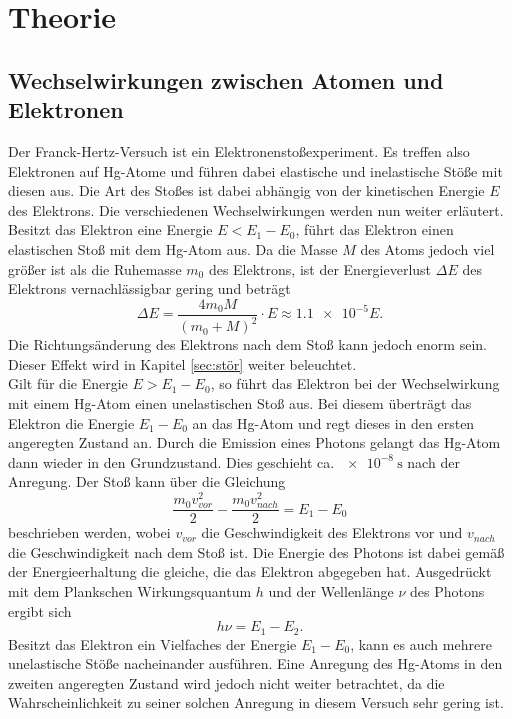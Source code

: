 \section{Theorie}
\label{sec:Theorie}

\subsection{Wechselwirkungen zwischen Atomen und Elektronen}
\label{sec:wechsel}
Der Franck-Hertz-Versuch ist ein Elektronenstoßexperiment. Es treffen also Elektronen auf Hg-Atome und führen dabei elastische und
inelastische Stöße mit diesen aus. Die Art des Stoßes ist dabei abhängig von der kinetischen Energie $E$ des Elektrons. Die verschiedenen
Wechselwirkungen werden nun weiter erläutert.
\\\noindent
Besitzt das Elektron eine Energie $E<E_1-E_0$, führt das Elektron einen elastischen Stoß mit dem Hg-Atom aus. Da die Masse $M$ des Atoms
jedoch viel größer ist als die Ruhemasse $m_0$ des Elektrons, ist der Energieverlust $\Delta E$ des Elektrons vernachlässigbar gering und beträgt
\begin{equation*}
    \Delta E=\frac{4m_0M}{(m_0+M)^2}\cdot E\approx \num{1.1e-5}E    .
\end{equation*}
Die Richtungsänderung des Elektrons nach dem Stoß kann jedoch enorm sein. Dieser Effekt wird in Kapitel \ref{sec:stör} weiter beleuchtet.
\\\noindent
Gilt für die Energie $E>E_1-E_0$, so führt das Elektron bei der Wechselwirkung mit einem Hg-Atom einen unelastischen Stoß aus. Bei diesem
überträgt das Elektron die Energie $E_1-E_0$ an das Hg-Atom und regt dieses in den ersten angeregten Zustand an. Durch die Emission eines
Photons gelangt das Hg-Atom dann wieder in den Grundzustand. Dies geschieht ca. $\SI{e-8}{\second}$ nach der Anregung. Der Stoß kann über
die Gleichung
\begin{equation}
    \frac{m_0v_{vor}^2}{2}-\frac{m_0v_{nach}^2}{2}=E_1-E_0
    \label{eqn:stoß}
\end{equation}
beschrieben werden, wobei $v_{vor}$ die Geschwindigkeit des Elektrons vor und $v_{nach}$ die Geschwindigkeit nach dem Stoß ist.
Die Energie des Photons ist dabei gemäß der Energieerhaltung die gleiche, die das Elektron abgegeben hat.
Ausgedrückt mit dem Plankschen Wirkungsquantum $h$ und der Wellenlänge $\nu$ des Photons ergibt sich
\begin{equation}
    h\nu=E_1-E_2    .
    \label{eqn:photon}
\end{equation}
Besitzt das Elektron ein Vielfaches der Energie $E_1-E_0$, kann es auch mehrere unelastische Stöße nacheinander ausführen. Eine Anregung
des Hg-Atoms in den zweiten angeregten Zustand wird jedoch nicht weiter betrachtet, da die Wahrscheinlichkeit zu seiner solchen Anregung
in diesem Versuch sehr gering ist.

